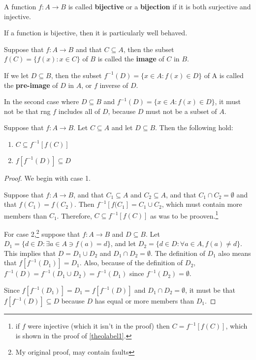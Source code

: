 \begin{definition}[Bijection]
	A function $f:A\rightarrow B$ is called \textbf{bijective} or a \textbf{bijection} if it is both surjective and injective.
\end{definition}

If a function is bijective, then it is particularly well behaved.

\begin{definition}
	\label{image}
	Suppose that $f:A\rightarrow B$ and that $C\subseteq A$, then the subset $f(C) = \{f(x):x\in C\}$ of $B$ is called the \textbf{image} of $C$ in $B$.
	
	If we let $D\subseteq B$, then the subset $f^{-1}(D)=\{x\in A: f(x)\in D\}$ of A is called the \textbf{pre-image} of $D$ in $A$, or $f$ inverse of $D$. 
\end{definition}

\begin{remark}
	In the second case where $D\subseteq B$ and $f^{-1}(D)=\{x\in A: f(x)\in D\}$, it must not be that rng $f$ includes all of $D$, because $D$ must not be a subset of $A$.
\end{remark}

\begin{theorem}
	Suppose that $f:A\rightarrow B$. Let $C\subseteq A$ and let $D\subseteq B$. Then the following hold:
	\begin{enumerate}
		\item $C \subseteq f^{-1}[f(C)]$
		\item $f[f^{-1}(D)]\subseteq D$
	\end{enumerate}
\end{theorem}
	
\begin{proof}
	We begin with case 1.
	
	Suppose that $f:A\rightarrow B$, and that $C_1\subseteq A$ and $C_2\subseteq A$, and that $C_1 \cap C_2 = \emptyset$ and that $f(C_1)=f(C_2)$. Then $f^{-1}[f(C_1]=C_1 \cup C_2$, which must contain more members than $C_1$. Therefore, $C\subseteq f^{-1}[f(C)]$ as was to be prooven.\footnote{if $f$ were injective (which it isn't in the proof) then $C = f^{-1}[f(C)]$, which is shown in the proof of \ref{theolabel1}.} \bigskip
	
	For case 2,\footnote{My original proof, may contain faults} suppose that $f:A\rightarrow B$ and $D\subseteq B$. Let $D_1 = \{d\in D: \exists a\in A \ni f(a)=d\}$, and let $D_2 = \{d\in D: \forall a\in A,f(a)\neq d\}$. This implies that $D = D_1 \cup D_2$ and $D_1 \cap D_2 = \emptyset$. The definition of $D_1$ also means that $f[f^{-1}(D_1)] = D_1$. Also, because of the definition of $D_2$, $f^{-1}(D)=f^{-1}(D_1\cup D_2)=f^{-1}(D_1)$ since $f^{-1}(D_2)=\emptyset$.
	
	Since $f[f^{-1}(D_1)] = D_1 = f[f^{-1}(D)]$ and $D_1 \cap D_2 = \emptyset$, it must be that $f[f^{-1}(D)]\subseteq D$ because $D$ has equal or more members than $D_1$.
\end{proof}

